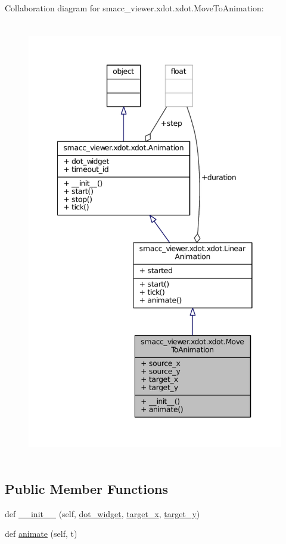 Collaboration diagram for smacc\+\_\+viewer.\+xdot.\+xdot.\+Move\+To\+Animation\+:
\nopagebreak
\begin{figure}[H]
\begin{center}
\leavevmode
\includegraphics[height=550pt]{classsmacc__viewer_1_1xdot_1_1xdot_1_1MoveToAnimation__coll__graph}
\end{center}
\end{figure}
\subsection*{Public Member Functions}
\begin{DoxyCompactItemize}
\item 
def \hyperlink{classsmacc__viewer_1_1xdot_1_1xdot_1_1MoveToAnimation_a107c74cfb7a7c06221ffcf983feff1a4}{\+\_\+\+\_\+init\+\_\+\+\_\+} (self, \hyperlink{classsmacc__viewer_1_1xdot_1_1xdot_1_1Animation_a0fca25f51eb80a7ba49233a0729ab955}{dot\+\_\+widget}, \hyperlink{classsmacc__viewer_1_1xdot_1_1xdot_1_1MoveToAnimation_a5ea1e33ebe1d6ab9bfa86a336b3a2524}{target\+\_\+x}, \hyperlink{classsmacc__viewer_1_1xdot_1_1xdot_1_1MoveToAnimation_af354769fa237bb3f62cf02d9ca92da4f}{target\+\_\+y})
\item 
def \hyperlink{classsmacc__viewer_1_1xdot_1_1xdot_1_1MoveToAnimation_aa0c81242a1d980cf2ffb4d2f3179f8c9}{animate} (self, t)
\end{DoxyCompactItemize}

